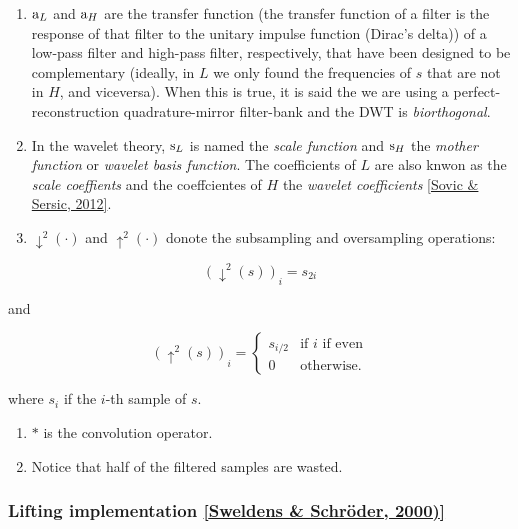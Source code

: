 \begin{enumerate}
\def\labelenumi{\arabic{enumi}.}
\item
  \({\text a}_L\) and \({\text a}_H\) are the transfer function (the
  transfer function of a filter is the response of that filter to the
  unitary impulse function (Dirac's delta)) of a low-pass filter and
  high-pass filter, respectively, that have been designed to be
  complementary (ideally, in \(L\) we only found the frequencies of
  \(s\) that are not in \(H\), and viceversa). When this is true, it is
  said the we are using a perfect-reconstruction quadrature-mirror
  filter-bank and the DWT is \emph{biorthogonal}.
\item
  In the wavelet theory, \({\text s}_L\) is named the \emph{scale
  function} and \({\text s}_H\) the \emph{mother function} or
  \emph{wavelet basis function}. The coefficients of \(L\) are also
  knwon as the \emph{scale coeffients} and the coeffcientes of \(H\) the
  \emph{wavelet coefficients}
  \href{https://scholar.google.es/scholar?hl=en\&as_sdt=0\%2C5\&q=Ana+Sovic+and+Damir+Sersic.+Signal+decomposition+methods+for+reducind+drawbacks+of+the+dwt\&btnG=}{{[}Sovic
  \& Sersic, 2012{]}}.
\item
  \(\downarrow^2(\cdot)\) and \(\uparrow^2(\cdot)\) donote the
  subsampling and oversampling operations:
\end{enumerate}

\begin{equation}
    (\downarrow^2(s))_i = s_{2i}
  \end{equation}

and

\begin{equation}
    (\uparrow^2(s))_i =
  \left\{
  \begin{array}{ll}
    s_{i/2} & \text{if $i$ if even} \\
    0 & \text{otherwise}.
  \end{array}
  \right.
  \end{equation}

where \(s_i\) if the \(i\)-th sample of \(s\).

\begin{enumerate}
\def\labelenumi{\arabic{enumi}.}
\setcounter{enumi}{3}
\item
  \(*\) is the convolution operator.
\item
  Notice that half of the filtered samples are wasted.
\end{enumerate}

    \hypertarget{lifting-implementation-sweldens-schruxf6der-2000}{%
\subsubsection{\texorpdfstring{Lifting implementation
\href{https://scholar.google.es/scholar?hl=es\&as_sdt=0\%2C5\&q=building+wavelets+at+home\&btnG=}{{[}Sweldens
\& Schröder,
2000){]}}}{Lifting implementation {[}Sweldens \& Schröder, 2000){]}}}\label{lifting-implementation-sweldens-schruxf6der-2000}}

